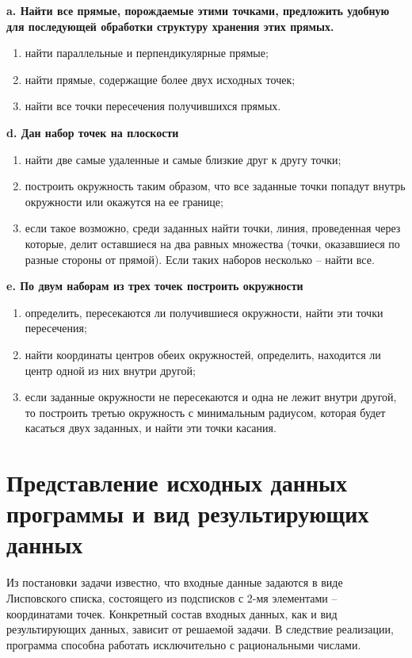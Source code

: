 \documentclass[a4paper, 11pt]{article}
\begin{document}
\noindent\textbf{a. Найти все прямые, порождаемые этими точками, предложить удобную для
последующей обработки структуру хранения этих прямых.}
\begin{enumerate}
  \item найти параллельные и перпендикулярные прямые;
  \item найти прямые, содержащие более двух исходных точек;
  \item найти все точки пересечения получившихся прямых.
\end{enumerate}
\noindent\textbf{d. Дан набор точек на плоскости}
\begin{enumerate}
  \item найти две самые удаленные и самые близкие друг к другу точки;
  \item построить окружность таким образом, что все заданные точки попадут внутрь окружности или окажутся на ее границе;
  \item если такое возможно, среди заданных найти точки, линия, проведенная через которые, делит оставшиеся на два равных множества (точки, оказавшиеся по разные стороны от прямой). Если таких наборов несколько – найти все.
\end{enumerate}
\noindent\textbf{e. По двум наборам из трех точек построить окружности}
\begin{enumerate}
  \item определить, пересекаются ли получившиеся окружности, найти эти точки пересечения;
  \item найти координаты центров обеих окружностей, определить, находится ли центр одной из них внутри другой;
  \item если заданные окружности не пересекаются и одна не лежит внутри другой, то построить третью окружность с минимальным радиусом, которая будет касаться двух заданных, и найти эти точки касания.
\end{enumerate}
\newpage

\section{Представление исходных данных программы и вид результирующих данных}
Из постановки задачи известно, что входные данные задаются в виде Лисповского списка,
состоящего из подсписков с 2-мя элементами – координатами точек.
Конкретный состав входных данных, как и вид результирующих данных, зависит от решаемой задачи.
В следствие реализации, программа способна работать исключительно с рациональными числами.
\newline
\end{document}
